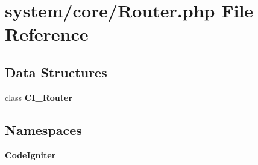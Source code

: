 \section{system/core/\-Router.php File Reference}
\label{_router_8php}
\subsection*{Data Structures}
\begin{DoxyCompactItemize}
\item 
class {\bf C\-I\-\_\-\-Router}
\end{DoxyCompactItemize}
\subsection*{Namespaces}
\begin{DoxyCompactItemize}
\item 
{\bf Code\-Igniter}
\end{DoxyCompactItemize}
